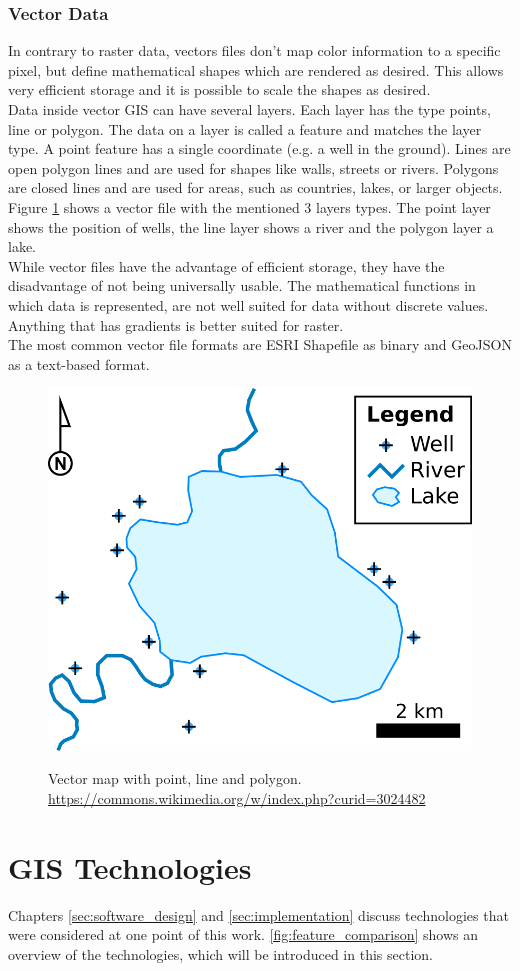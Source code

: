 \subsubsection{Vector Data}
In contrary to raster data, vectors files don't map color information to a specific pixel, but define mathematical shapes which are rendered as desired. This allows very efficient storage and it is possible to scale the shapes as desired.\\
Data inside vector GIS can have several layers. Each layer has the type points, line or polygon. The data on a layer is called a feature and matches the layer type. A point feature has a single coordinate (e.g. a well in the ground). Lines are open polygon lines and are used for shapes like walls, streets or rivers. Polygons are closed lines and are used for areas, such as countries, lakes, or larger objects. Figure \ref{img:vector} shows a vector file with the mentioned 3 layers types. The point layer shows the position of wells, the line layer shows a river and the polygon layer a lake.\\
While vector files have the advantage of efficient storage, they have the disadvantage of not being universally usable. The mathematical functions in which data is represented, are not well suited for data without discrete values. Anything that has gradients is better suited for raster.\\
The most common vector file formats are ESRI Shapefile as binary and GeoJSON as a text-based format.

\begin{figure}[H]
	\centering
	\includegraphics[width=0.4\columnwidth]{res/vector-map}\\
	\caption[]{Vector map with point, line and polygon. \url{https://commons.wikimedia.org/w/index.php?curid=3024482}}
	\label{img:vector}
\end{figure}



\section{GIS Technologies}
Chapters \ref{sec:software_design} and \ref{sec:implementation} discuss technologies that were considered at one point of this work. \ref{fig:feature_comparison} shows an overview of the technologies, which will be introduced in this section.


